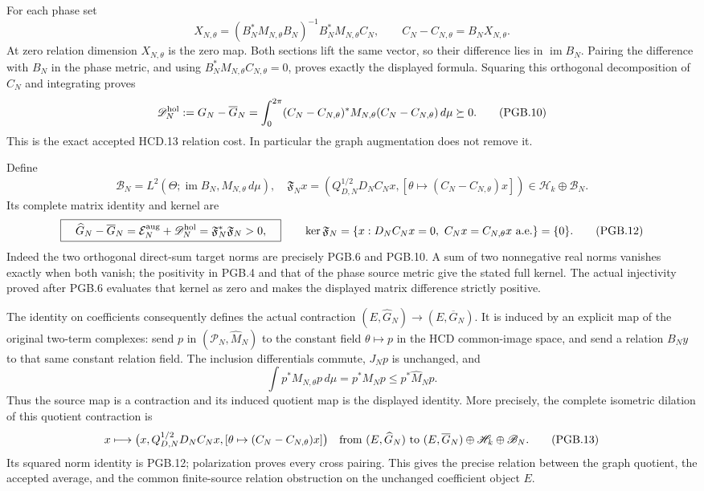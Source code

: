 For each phase set
\[
 X_{N,\theta}=(B_N^*M_{N,\theta}B_N)^{-1}
                          B_N^*M_{N,\theta}C_N,
 \qquad C_N-C_{N,\theta}=B_NX_{N,\theta}.
 \tag{PGB.9}\label{eq:pgb-original-relation-field}
\]
At zero relation dimension $X_{N,\theta}$ is the zero map.
Both sections lift the same vector, so their difference lies in
$\operatorname{im}B_N$. Pairing the difference with $B_N$ in
the phase metric, and using $B_N^*M_{N,\theta}C_{N,\theta}=0$,
proves exactly the displayed formula. Squaring this orthogonal
decomposition of $C_N$ and integrating proves
\[
 \mathscr D_N^{\rm hol}:=G_N-\overline G_N
 =\int_0^{2\pi}(C_N-C_{N,\theta})^*M_{N,\theta}
                      (C_N-C_{N,\theta})\,d\mu\succeq0.
 \tag{PGB.10}\label{eq:pgb-original-gap}
\]
This is the exact accepted HCD.13 relation cost. In particular
the graph augmentation does not remove it.

Define
\[
 \mathscr B_N=L^2(\Theta;\operatorname{im}B_N,
                                  M_{N,\theta}\,d\mu),
 \quad
 \mathfrak F_Nx=
 \left(Q_{D,N}^{1/2}D_NC_Nx,
       [\theta\mapsto(C_N-C_{N,\theta})x]\right)
 \in\mathscr H_k\oplus\mathscr B_N.
 \tag{PGB.11}\label{eq:pgb-full-defect-map}
\]
Its complete matrix identity and kernel are
\[
 \boxed{\quad
 \widehat G_N-\overline G_N
 =\mathcal E_N^{\rm aug}+\mathscr D_N^{\rm hol}
 =\mathfrak F_N^*\mathfrak F_N>0,\quad}
 \qquad
 \ker\mathfrak F_N
 =\{x:D_NC_Nx=0,\ C_Nx=C_{N,\theta}x\text{ a.e.}\}=\{0\}.
 \tag{PGB.12}\label{eq:pgb-main-bridge}
\]
Indeed the two orthogonal direct-sum target norms are precisely
PGB.6 and PGB.10. A sum of two nonnegative real norms vanishes
exactly when both vanish; the positivity in PGB.4 and that of
the phase source metric give the stated full kernel.
The actual injectivity proved after PGB.6 evaluates that kernel
as zero and makes the displayed matrix difference strictly positive.

The identity on coefficients consequently defines the actual
contraction $(E,\widehat G_N)\to(E,\overline G_N)$. It is
induced by an explicit map of the original two-term complexes:
send $p$ in $(\mathcal P_N,\widehat M_N)$ to the constant
field $\theta\mapsto p$ in the HCD common-image space, and
send a relation $B_Ny$ to that same constant relation field.
The inclusion differentials commute, $J_Np$ is unchanged, and
\[
 \int p^*M_{N,\theta}p\,d\mu=p^*M_Np
                  \leq p^*\widehat M_Np.
\]
Thus the source map is a contraction and its induced quotient
map is the displayed identity. More precisely, the complete
isometric dilation of this quotient contraction is
\[
 x\longmapsto
 \bigl(x,Q_{D,N}^{1/2}D_NC_Nx,
             [\theta\mapsto(C_N-C_{N,\theta})x]\bigr)
 \quad\hbox{from }(E,\widehat G_N)
 \hbox{ to }(E,\overline G_N)\oplus\mathscr H_k\oplus\mathscr B_N.
 \tag{PGB.13}\label{eq:pgb-isometric-dilation}
\]
Its squared norm identity is PGB.12; polarization proves every
cross pairing. This gives the precise relation between the graph
quotient, the accepted average, and the common finite-source
relation obstruction on the unchanged coefficient object $E$.

